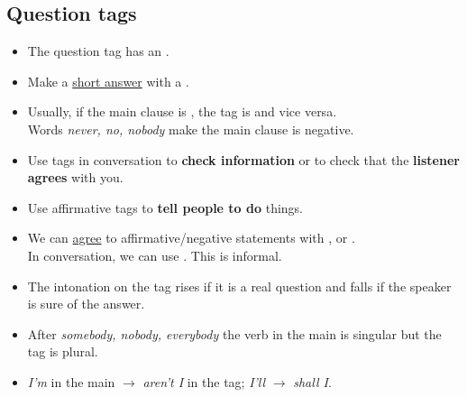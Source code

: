 \subsection{Question tags}
\begin{itemize}
    \item The question tag has an .
    \item Make a \underline{short answer} with a .
    \item Usually, if the main clause is , the tag is  and vice versa.\\
    Words  \textit{never, no, nobody} make the main clause is negative.
    \item Use tags in conversation to \textbf{check information}
    or to check that the \textbf{listener agrees} with you.
    \item[\doot] Use affirmative tags  to \textbf{tell people to do} things.
    \item We can \underline{agree} to affirmative/negative statements
    with ,
        or .\\
    In conversation, we can use . This is informal.
    \item[\ast] The intonation on the tag rises if it is a real question and falls if the speaker is sure of the answer.
    \item[\aast] After \textit{somebody, nobody, everybody} the verb in the main is singular but the tag is plural.
    \item[\ast] \textit{I'm} in the main $\rightarrow$ \textit{aren't I} in the tag;
    \textit{I'll} $\rightarrow$ \textit{shall I}.
\end{itemize}
